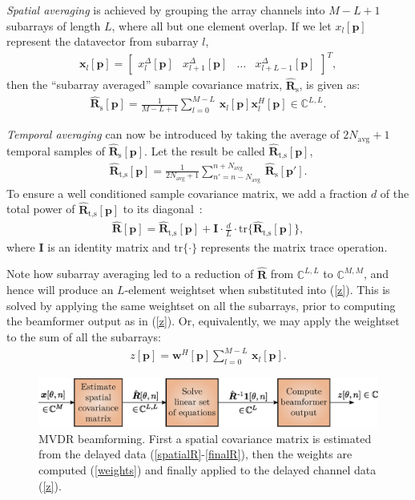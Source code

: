 \documentclass[12pt,journal,captionsoff,onecolumn]{IEEEtran}
\let\MYoriglatexcaption\caption               %
\renewcommand{\caption}[2][\relax]{\MYoriglatexcaption[#2]{#2}}
\newcommand\bmat[1]{\begin{bmatrix}#1\end{bmatrix}}
\newcommand\tr{\text{tr}}
\newcommand\sumb[2]{\sum\limits_{#1}^{#2}\,}
\newcommand\T{^{\scriptscriptstyle T}}
\renewcommand\H{^{\scriptscriptstyle H}}
\renewcommand\vec[1]{\boldsymbol{#1}}
\newcommand\mat[1]{\boldsymbol{#1}}
\newcommand\1{\vec 1}
\newcommand\I{\mat I}
\newcommand*\p{\vec p}
\newcommand*\w{\vec w}
\newcommand*\x{\vec x}
\newcommand*\eR{\mat{\hat R}}
\begin{document}
\emph{Spatial averaging} is achieved by grouping the array channels into $M-L+1$ subarrays of length $L$, where all but one element overlap. If we let $x_l[\p]$ represent the datavector from subarray $l$,
\begin{gather}
\x_l[\p] = \bmat{x^\Delta_l[\p] & x^\Delta_{l+1}[\p] & \dots & x^\Delta_{l+L-1}[\p]}\T,
\end{gather}
then the ``subarray averaged'' sample covariance matrix, $\eR_\text{s}$, is given as:
\begin{gather}
\eR_\text{s}[\p] = \frac{1}{M-L+1} \sumb{l=0}{M-L} \x_l[\p]\x_l\H[\p] \in\mathbb{C}^{L,L}.\label{spatialR}
\end{gather}

\emph{Temporal averaging} can now be introduced by taking the average of $2N_\text{avg}+1$ temporal samples of $\eR_\text{s}[\p]$. Let the result be called $\eR_\text{t,s}[\p]$,
\begin{gather}
\eR_\text{t,s}[\p] = \frac{1}{2N_\text{avg}+1} \sumb{n'=n-N_\text{avg}}{n+N_\text{avg}} \eR_\text{s}[\p'].
\end{gather}
To ensure a well conditioned sample covariance matrix, we add a fraction $d$ of the total power of $\eR_\text{t,s}[\p]$ to its diagonal~\cite{Synnevag2007}:
\begin{align}
\eR[\p] = \eR_\text{t,s}[\p] + \I \cdot \frac{d}{L} \cdot \tr\{\eR_\text{t,s}[\p]\},\label{finalR}
\end{align}
where $\I$ is an identity matrix and $\tr\{\cdot\}$ represents the matrix trace operation.

Note how subarray averaging led to a reduction of $\eR$ from $\mathbb{C}^{L,L}$ to $\mathbb{C}^{M,M}$, and hence will produce an $L$-element weightset when substituted into (\ref{z}). This is solved by applying the same weightset on all the subarrays, prior to computing the beamformer output as in (\ref{z}). Or, equivalently, we may apply the weightset to the sum of all the subarrays:
\begin{align}
z[\p] = \w\H[\p] \sumb{l=0}{M-L} \x_l[\p].\label{finaleR}
\end{align}

\begin{figure}[!t]\centering
\includegraphics[width=\linewidth]{gfx/algorithm_structure.eps}
\caption{MVDR beamforming. First a spatial covariance matrix is estimated from the delayed data (\ref{spatialR}-\ref{finalR}), then the weights are computed (\ref{weights}) and finally applied to the delayed channel data (\ref{z}).}
\label{implementation}
\end{figure}
\end{document}
